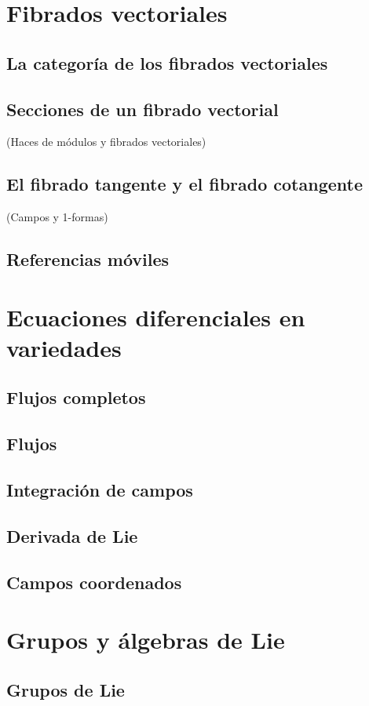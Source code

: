 \documentclass[12pt,a4paper]{book}
\theoremstyle{definition} \newtheorem{defn}[thm]{Definición}
\theoremstyle{definition} \newtheorem{ejemplo}[thm]{Ejemplo}
\theoremstyle{definition} \newtheorem{ejercicio}[thm]{Ejercicio}
\theoremstyle{remark} \newtheorem*{obs}{Observación}
\begin{document}
	  \chapter{Fibrados vectoriales}
	  \section{La categoría de los fibrados vectoriales}
	  \section{Secciones de un fibrado vectorial}
	  (Haces de módulos y fibrados vectoriales)
	  \section{El fibrado tangente y el fibrado cotangente}
	  (Campos y 1-formas)
	  \section{Referencias móviles}

	  \chapter{Ecuaciones diferenciales en variedades}
	  \section{Flujos completos}
	  \section{Flujos}
	  \section{Integración de campos}
	  \section{Derivada de Lie}
	  \section{Campos coordenados}
	  \chapter{Grupos y álgebras de Lie}
	  \section{Grupos de Lie}
\end{document}
